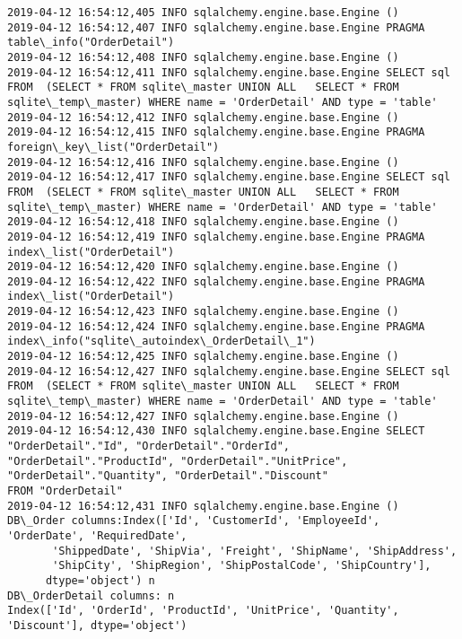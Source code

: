 \documentclass[11pt]{article}
\begin{document}
\begin{Verbatim}[commandchars=\\\{\}]
2019-04-12 16:54:12,405 INFO sqlalchemy.engine.base.Engine ()
2019-04-12 16:54:12,407 INFO sqlalchemy.engine.base.Engine PRAGMA table\_info("OrderDetail")
2019-04-12 16:54:12,408 INFO sqlalchemy.engine.base.Engine ()
2019-04-12 16:54:12,411 INFO sqlalchemy.engine.base.Engine SELECT sql FROM  (SELECT * FROM sqlite\_master UNION ALL   SELECT * FROM sqlite\_temp\_master) WHERE name = 'OrderDetail' AND type = 'table'
2019-04-12 16:54:12,412 INFO sqlalchemy.engine.base.Engine ()
2019-04-12 16:54:12,415 INFO sqlalchemy.engine.base.Engine PRAGMA foreign\_key\_list("OrderDetail")
2019-04-12 16:54:12,416 INFO sqlalchemy.engine.base.Engine ()
2019-04-12 16:54:12,417 INFO sqlalchemy.engine.base.Engine SELECT sql FROM  (SELECT * FROM sqlite\_master UNION ALL   SELECT * FROM sqlite\_temp\_master) WHERE name = 'OrderDetail' AND type = 'table'
2019-04-12 16:54:12,418 INFO sqlalchemy.engine.base.Engine ()
2019-04-12 16:54:12,419 INFO sqlalchemy.engine.base.Engine PRAGMA index\_list("OrderDetail")
2019-04-12 16:54:12,420 INFO sqlalchemy.engine.base.Engine ()
2019-04-12 16:54:12,422 INFO sqlalchemy.engine.base.Engine PRAGMA index\_list("OrderDetail")
2019-04-12 16:54:12,423 INFO sqlalchemy.engine.base.Engine ()
2019-04-12 16:54:12,424 INFO sqlalchemy.engine.base.Engine PRAGMA index\_info("sqlite\_autoindex\_OrderDetail\_1")
2019-04-12 16:54:12,425 INFO sqlalchemy.engine.base.Engine ()
2019-04-12 16:54:12,427 INFO sqlalchemy.engine.base.Engine SELECT sql FROM  (SELECT * FROM sqlite\_master UNION ALL   SELECT * FROM sqlite\_temp\_master) WHERE name = 'OrderDetail' AND type = 'table'
2019-04-12 16:54:12,427 INFO sqlalchemy.engine.base.Engine ()
2019-04-12 16:54:12,430 INFO sqlalchemy.engine.base.Engine SELECT "OrderDetail"."Id", "OrderDetail"."OrderId", "OrderDetail"."ProductId", "OrderDetail"."UnitPrice", "OrderDetail"."Quantity", "OrderDetail"."Discount" 
FROM "OrderDetail"
2019-04-12 16:54:12,431 INFO sqlalchemy.engine.base.Engine ()
DB\_Order columns:Index(['Id', 'CustomerId', 'EmployeeId', 'OrderDate', 'RequiredDate',
       'ShippedDate', 'ShipVia', 'Freight', 'ShipName', 'ShipAddress',
       'ShipCity', 'ShipRegion', 'ShipPostalCode', 'ShipCountry'],
      dtype='object') n
DB\_OrderDetail columns: n
Index(['Id', 'OrderId', 'ProductId', 'UnitPrice', 'Quantity', 'Discount'], dtype='object')

    \end{Verbatim}
\end{document}
